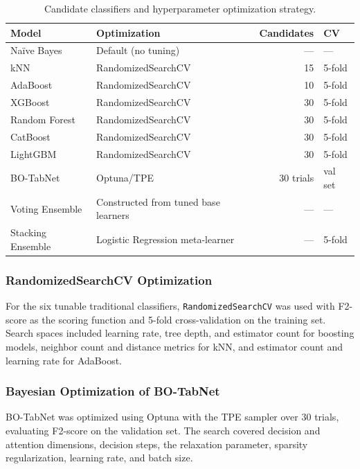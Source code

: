 \begin{table}[H]
\centering
\caption{Candidate classifiers and hyperparameter optimization strategy.}
\label{tab:model_optimization}
\begin{tabular}{p{3.6cm}p{4.8cm}rp{1.4cm}}
\hline
\textbf{Model} & \textbf{Optimization} & \textbf{Candidates} & \textbf{CV} \\
\hline
Na\"ive Bayes & Default (no tuning) & --- & --- \\
kNN & RandomizedSearchCV & 15 & 5-fold \\
AdaBoost & RandomizedSearchCV & 10 & 5-fold \\
XGBoost & RandomizedSearchCV & 30 & 5-fold \\
Random Forest & RandomizedSearchCV & 30 & 5-fold \\
CatBoost & RandomizedSearchCV & 30 & 5-fold \\
LightGBM & RandomizedSearchCV & 30 & 5-fold \\
BO-TabNet & Optuna/TPE & 30 trials & val set \\
Voting Ensemble & Constructed from tuned base learners & --- & --- \\
Stacking Ensemble & Logistic Regression meta-learner & --- & 5-fold \\
\hline
\end{tabular}
\end{table}

\subsubsection{RandomizedSearchCV Optimization}

For the six tunable traditional classifiers, \texttt{RandomizedSearchCV} was used with F2-score as the scoring function and 5-fold cross-validation on the training set. Search spaces included learning rate, tree depth, and estimator count for boosting models, neighbor count and distance metrics for kNN, and estimator count and learning rate for AdaBoost.

\subsubsection{Bayesian Optimization of BO-TabNet}

BO-TabNet was optimized using Optuna with the TPE sampler over 30 trials, evaluating F2-score on the validation set. The search covered decision and attention dimensions, decision steps, the relaxation parameter, sparsity regularization, learning rate, and batch size.

